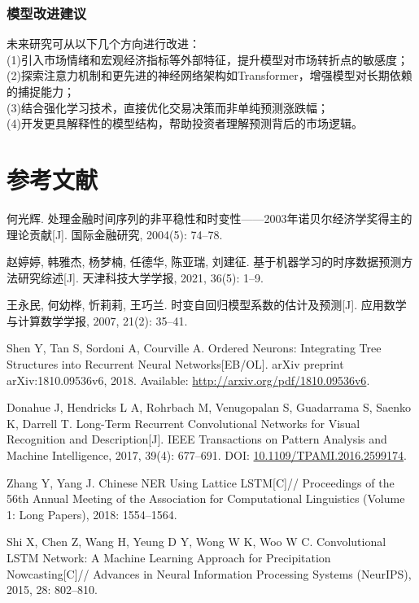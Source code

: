 \documentclass[a4paper,11pt]{ctexart}
\begin{document}
\subsubsection{模型改进建议}
未来研究可从以下几个方向进行改进：\\
(1)引入市场情绪和宏观经济指标等外部特征，提升模型对市场转折点的敏感度；\\
(2)探索注意力机制和更先进的神经网络架构如Transformer，增强模型对长期依赖的捕捉能力；\\
(3)结合强化学习技术，直接优化交易决策而非单纯预测涨跌幅；\\
(4)开发更具解释性的模型结构，帮助投资者理解预测背后的市场逻辑。\\

\newpage
\section{参考文献}
\renewcommand\refname{} %
\begin{thebibliography}{9}

何光辉. 处理金融时间序列的非平稳性和时变性——2003年诺贝尔经济学奖得主的理论贡献[J]. 国际金融研究, 2004(5): 74–78.

赵婷婷, 韩雅杰, 杨梦楠, 任德华, 陈亚瑞, 刘建征. 基于机器学习的时序数据预测方法研究综述[J]. 天津科技大学学报, 2021, 36(5): 1–9.

王永民, 何幼桦, 忻莉莉, 王巧兰. 时变自回归模型系数的估计及预测[J]. 应用数学与计算数学学报, 2007, 21(2): 35–41.

Shen Y, Tan S, Sordoni A, Courville A. Ordered Neurons: Integrating Tree Structures into Recurrent Neural Networks[EB/OL]. arXiv preprint arXiv:1810.09536v6, 2018. Available: \url{http://arxiv.org/pdf/1810.09536v6}.

Donahue J, Hendricks L A, Rohrbach M, Venugopalan S, Guadarrama S, Saenko K, Darrell T. Long-Term Recurrent Convolutional Networks for Visual Recognition and Description[J]. IEEE Transactions on Pattern Analysis and Machine Intelligence, 2017, 39(4): 677–691. DOI: \href{https://doi.org/10.1109/TPAMI.2016.2599174}{10.1109/TPAMI.2016.2599174}.

Zhang Y, Yang J. Chinese NER Using Lattice LSTM[C]// Proceedings of the 56th Annual Meeting of the Association for Computational Linguistics (Volume 1: Long Papers), 2018: 1554–1564. 

Shi X, Chen Z, Wang H, Yeung D Y, Wong W K, Woo W C. Convolutional LSTM Network: A Machine Learning Approach for Precipitation Nowcasting[C]// Advances in Neural Information Processing Systems (NeurIPS), 2015, 28: 802–810.

\end{thebibliography}
\end{document}

